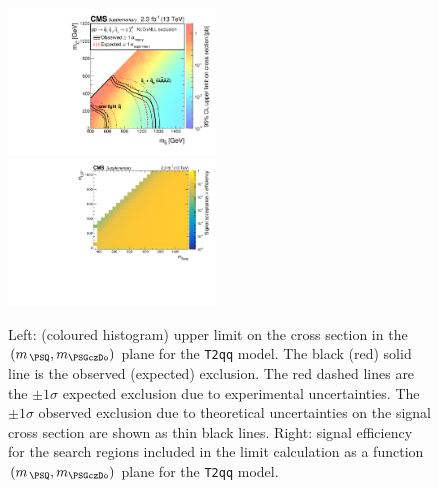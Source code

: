 \clearpage
\begin{figure}[!h]
  \begin{center}
    \includegraphics[width=0.49\textwidth]{RA1T2qqXSEC_aux} \, 
    \includegraphics[width=0.49\textwidth]{T2qq_merging_4_cats_aux} \,     
  \end{center}
  \caption{Left: (coloured histogram) upper limit on the cross section in the $(m_{\,\PSQ}, m_{\PSGczDo})$ plane for the \texttt{T2qq} model. 
  The black (red) solid line is the observed (expected) exclusion. The red dashed lines are the $\pm1\sigma$ expected exclusion due to experimental uncertainties. 
  The $\pm1\sigma$ observed exclusion due to theoretical uncertainties on the signal cross section are shown as thin black lines. 
  Right: signal efficiency for the search regions included in the limit calculation as a function $(m_{\,\PSQ}, m_{\PSGczDo})$ plane for the \texttt{T2qq} model. 
  \label{fig:T2qq_excl}}
\end{figure}


